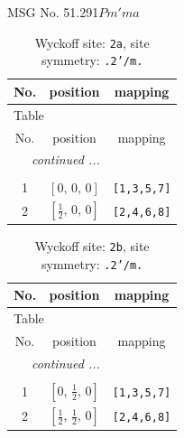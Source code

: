 \documentclass[fleqn,8pt]{jsarticle}
\begin{document}
\setcounter{MaxMatrixCols}{32}

\renewcommand{\tablename}{Table~}
\renewcommand{\figurename}{Figure~}
\begin{center}
\LARGE
MSG No. 51.291\quad$Pm'ma$
\end{center}
\renewcommand{\arraystretch}{1.2}
\begin{longtable}{ccc}
\caption{Wyckoff site: {\tt 2a}, site symmetry: {\tt .2'/m.}}
 \\
 \hline \hline
No. & position & mapping \\ \hline \endfirsthead

\multicolumn{2}{l}{\tablename\ \thetable{}} \\
 \hline \hline
No. & position & mapping \\ \hline \endhead

 \hline \hline
\multicolumn{2}{r}{\footnotesize\it continued ...} \\ \endfoot

 \hline \hline
\multicolumn{2}{r}{} \\ \endlastfoot

1 & $\left[ 0,\, 0,\, 0 \right]$ & {\tt [1,3,5,7]} \\ \hline
2 & $\left[ \frac{1}{2},\, 0,\, 0 \right]$ & {\tt [2,4,6,8]} \\
\end{longtable}
\renewcommand{\arraystretch}{1.2}
\begin{longtable}{ccc}
\caption{Wyckoff site: {\tt 2b}, site symmetry: {\tt .2'/m.}}
 \\
 \hline \hline
No. & position & mapping \\ \hline \endfirsthead

\multicolumn{2}{l}{\tablename\ \thetable{}} \\
 \hline \hline
No. & position & mapping \\ \hline \endhead

 \hline \hline
\multicolumn{2}{r}{\footnotesize\it continued ...} \\ \endfoot

 \hline \hline
\multicolumn{2}{r}{} \\ \endlastfoot

1 & $\left[ 0,\, \frac{1}{2},\, 0 \right]$ & {\tt [1,3,5,7]} \\ \hline
2 & $\left[ \frac{1}{2},\, \frac{1}{2},\, 0 \right]$ & {\tt [2,4,6,8]} \\
\end{longtable}
\renewcommand{\arraystretch}{1.2}
\end{document}
